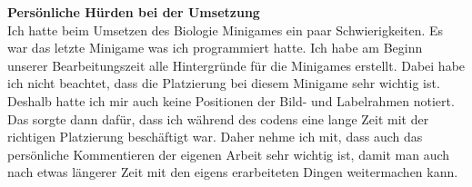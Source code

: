 \textbf{Persönliche Hürden bei der Umsetzung} \\
Ich hatte beim Umsetzen des Biologie Minigames ein paar Schwierigkeiten. Es war das letzte Minigame was ich programmiert hatte. Ich habe am Beginn unserer Bearbeitungszeit alle Hintergründe für die Minigames erstellt. Dabei habe ich nicht beachtet, dass die Platzierung bei diesem Minigame sehr wichtig ist. Deshalb hatte ich mir auch keine Positionen der Bild- und Labelrahmen notiert.
Das sorgte dann dafür, dass ich während des codens eine lange Zeit mit der richtigen Platzierung beschäftigt war. Daher nehme ich mit, dass auch das persönliche \glqq{}Kommentieren\grqq{} der eigenen Arbeit sehr wichtig ist, damit man auch nach etwas längerer Zeit mit den eigens erarbeiteten Dingen weitermachen kann.